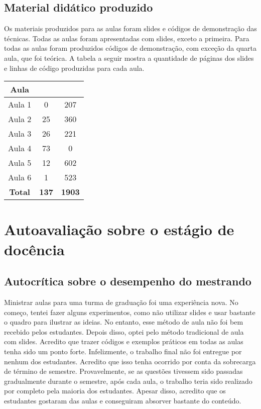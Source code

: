 \documentclass[
	12pt,				%
	openright,			%
	oneside,			%
	a4paper,			%
	chapter=TITLE,		%
	section=TITLE,		%
	english,			%
	french,				%
	spanish,			%
	brazil				%
	]{abntex2}
\begin{document}
\section{Material didático produzido}

Os materiais produzidos para as aulas foram slides e códigos de demonstração das técnicas.
Todas as aulas foram apresentadas com slides, exceto a primeira.
Para todas as aulas foram produzidos códigos de demonstração, com exceção da quarta aula, que foi teórica.
A tabela a seguir mostra a quantidade de páginas dos slides e linhas de código produzidas para cada aula.


\begin{center}
	\begin{tabular}{ |c|c|c| }
		\hline
		\cellcolor{gray!50} \textbf{Aula} & 
		\cellcolor{gray!50} \vtop{
			\hbox{\strut \ \ \ \ \ \ \ \ \textbf{Slides}}
			\hbox{\strut \textbf{(Nº de Páginas)}}
		} &
		\cellcolor{gray!50} \vtop{
			\hbox{\strut \ \ \ \ \ \ \textbf{Código}}
			\hbox{\strut \textbf{(Nº de Linhas)}}
		} \\ \hline
		Aula 1 & 0 & 207 \\ \hline
		Aula 2 & 25 & 360 \\ \hline
		Aula 3 & 26 & 221 \\ \hline
		Aula 4 & 73 & 0 \\ \hline
		Aula 5 & 12 & 602 \\ \hline
		Aula 6 & 1 & 523 \\ \hline
		\cellcolor{gray!50} \textbf{Total} & \cellcolor{gray!50} \textbf{137} & \cellcolor{gray!50} \textbf{1903} \\ \hline
	\end{tabular}
\end{center}

\newpage
\chapter{Autoavaliação sobre o estágio de docência}

\vspace{-1cm}

\section{Autocrítica sobre o desempenho do mestrando}

Ministrar aulas para uma turma de graduação foi uma experiência nova.
No começo, tentei fazer alguns experimentos, como não utilizar slides e usar bastante o quadro para ilustrar as ideias.
No entanto, esse método de aula não foi bem recebido pelos estudantes.
Depois disso, optei pelo método tradicional de aula com slides.
Acredito que trazer códigos e exemplos práticos em todas as aulas tenha sido um ponto forte.
Infelizmente, o trabalho final não foi entregue por nenhum dos estudantes.
Acredito que isso tenha ocorrido por conta da sobrecarga de término de semestre.
Provavelmente, se as questões tivessem sido passadas gradualmente durante o semestre, após cada aula, o trabalho teria sido realizado por completo pela maioria dos estudantes.
Apesar disso, acredito que os estudantes gostaram das aulas e conseguiram absorver bastante do conteúdo.
\end{document}
